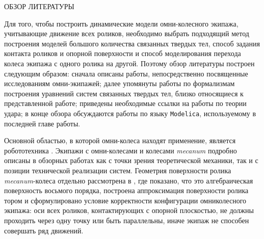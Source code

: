 
ОБЗОР ЛИТЕРАТУРЫ

Для того, чтобы построить динамические модели омни-колесного экипажа, учитывающие движение всех роликов, необходимо выбрать подходящий метод построения моделей большого количества связанных твердых тел, способ задания контакта роликов и опорной поверхности и способ моделирования перехода колеса экипажа с одного ролика на другой. Поэтому обзор литературы построен следующим образом: сначала описаны работы, непосредственно посвященные исследованиям омни-экипажей; далее упомянуты работы по формализмам построения уравнений систем связанных твердых тел, близко относящиеся к представленной работе; приведены необходимые ссылки на работы по теории удара; в конце обзора обсуждаются работы по языку \texttt{Modelica}, используемому в последней главе работы.

Основной областью, в которой омни-колеса находят применение, является робототехника \cite{Seeni2010,Martynenko2005,GolubevSnake2004}. Экипажи с омни-колесами и колесами \textit{mecanum} \cite{Ilon} подробно описаны в обзорных работах  \cite{Campion1996,Zimmermann2009,ChungIagnemma2016,Kanjanawanishkul2015,Adascalitei2011} как с точки зрения теоретической механики, так и с позиции технической реализации систем. Геометрия поверхности ролика \textit{mecanum}-колеса отдельно рассмотрена в \cite{Gfrerrer2008}, где показано, что это алгебраическая поверхность восьмого порядка, построена аппроксимация поверхности ролика тором и сформулировано условие корректности конфигурации омниколесного экипажа: оси всех роликов, контактирующих с опорной плоскостью, не должны проходить через одну точку или быть параллельны, иначе экипаж не способен совершать ряд движений.

